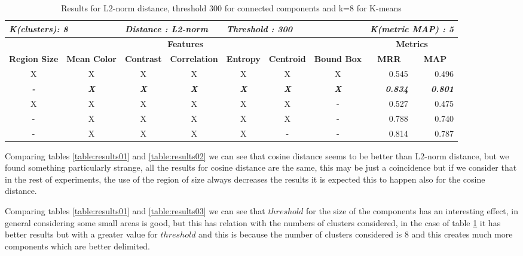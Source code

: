 \begin{table}[H]
\centering
\begin{tabular}{|c|c|c|c|c|c|c|r|r|}
\hline
\multicolumn{2}{|l|}{\textit{\textbf{K(clusters): 8}}} & \multicolumn{2}{l|}{\textit{\textbf{Distance : L2-norm}}} & \multicolumn{3}{l|}{\textit{\textbf{Threshold : 300}}} & \multicolumn{2}{l|}{\textit{\textbf{K(metric MAP) :  5}}} \\ \hline
\multicolumn{7}{|c|}{\textbf{Features}} & \multicolumn{2}{c|}{\textbf{Metrics}} \\ \hline
\textbf{Region Size} & \textbf{Mean Color} & \textbf{Contrast} & \textbf{Correlation} & \textbf{Entropy} & \textbf{Centroid} & \textbf{Bound Box} & \multicolumn{1}{c|}{\textbf{MRR}} & \multicolumn{1}{c|}{\textbf{MAP}} \\ \hline
X & X & X & X & X & X & X & 0.545 & 0.496 \\ \hline
\textit{\textbf{-}} & \textit{\textbf{X}} & \textit{\textbf{X}} & \textit{\textbf{X}} & \textit{\textbf{X}} & \textit{\textbf{X}} & \textit{\textbf{X}} & \textit{\textbf{0.834}} & \textit{\textbf{0.801}} \\ \hline
X & X & X & X & X & X & - & 0.527 & 0.475 \\ \hline
- & X & X & X & X & X & - & 0.788 & 0.740 \\ \hline
- & X & X & X & X & - & - & 0.814 & 0.787 \\ \hline
\end{tabular}
\caption{Results for L2-norm distance, threshold 300 for connected components and k=8 for K-means}
\label{table:results04}
\end{table}

Comparing tables \ref{table:results01} and \ref{table:results02} we can see that cosine distance seems to be better than L2-norm distance, but we found something particularly strange, all the results for cosine distance are the same, this may be just a coincidence but if we consider that in the rest of experiments, the use of the region of size always decreases the results it is expected this to happen also for the cosine distance.

Comparing tables \ref{table:results01} and \ref{table:results03} we can see that $threshold$ for the size of the components has an interesting effect, in general considering some small areas is good, but this has relation with the numbers of clusters considered, in the case of table \ref{table:results04} it has better results but with a greater value for $threshold$ and this is because the number of clusters considered is 8 and this creates much more components which are better delimited.

